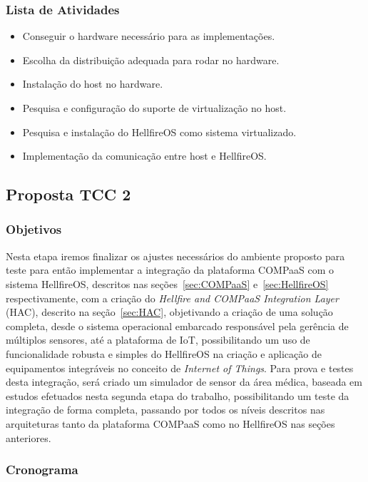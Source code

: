 \subsubsection{Lista de Atividades}
\begin{itemize}
\item Conseguir o hardware necessário para as implementações.
\item Escolha da distribuição adequada para rodar no hardware.
\item Instalação do host no hardware.
\item Pesquisa e configuração do suporte de virtualização no host.
\item Pesquisa e instalação do HellfireOS como sistema virtualizado.
\item Implementação da comunicação entre host e HellfireOS.
\end{itemize}

\subsection{Proposta TCC 2}
\subsubsection{Objetivos}
Nesta etapa iremos finalizar os ajustes necessários do ambiente proposto para teste para então
implementar a integração da plataforma COMPaaS com o sistema HellfireOS,
descritos nas seções~\ref{sec:COMPaaS} e~\ref{sec:HellfireOS} respectivamente, com a criação
do \textit{Hellfire and COMPaaS Integration Layer} (HAC), descrito na seção~\ref{sec:HAC},
objetivando a criação de uma solução completa, desde o sistema operacional embarcado
responsável pela gerência de múltiplos sensores, até a plataforma de IoT, possibilitando
um uso de funcionalidade robusta e simples do HellfireOS na criação e aplicação de
equipamentos integráveis no conceito de \textit{Internet of Things}.
Para prova e testes desta integração, será criado um simulador de sensor da área médica,
baseada em estudos efetuados nesta segunda etapa do trabalho, possibilitando um teste
da integração de forma completa, passando por todos os níveis descritos nas arquiteturas
tanto da plataforma COMPaaS como no HellfireOS nas seções anteriores.

\subsubsection{Cronograma}
\renewcommand{\arraystretch}{1.5}

